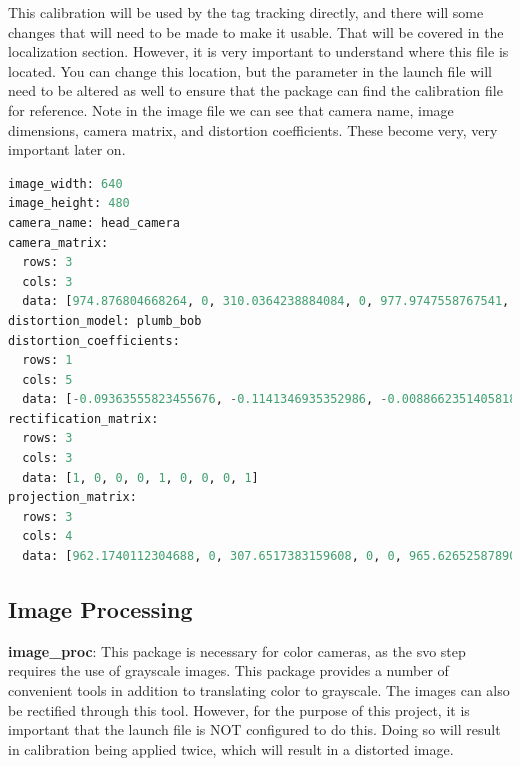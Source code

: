 \begin{itemize}
\begin{enumerate}
This calibration will be used by the tag tracking directly, and there will some changes that will need to be made to make it usable. That will be covered in the localization section. However, it is very important to understand where this file is located. You can change this location, but the parameter in the launch file will need to be altered as well to ensure that the package can find the calibration file for reference. Note in the image file we can see that camera name, image dimensions, camera matrix, and distortion coefficients. These become very, very important later on.
\begin{lstlisting}[language=python] 
image_width: 640
image_height: 480
camera_name: head_camera
camera_matrix:
  rows: 3
  cols: 3
  data: [974.876804668264, 0, 310.0364238884084, 0, 977.9747558767541, 183.9139863795955, 0, 0, 1]
distortion_model: plumb_bob
distortion_coefficients:
  rows: 1
  cols: 5
  data: [-0.09363555823455676, -0.1141346935352986, -0.008866235140581833, -0.0048644735641969, 0]
rectification_matrix:
  rows: 3
  cols: 3
  data: [1, 0, 0, 0, 1, 0, 0, 0, 1]
projection_matrix:
  rows: 3
  cols: 4
  data: [962.1740112304688, 0, 307.6517383159608, 0, 0, 965.6265258789062, 181.2353823390822, 0, 0, 0, 1, 0]
\end{lstlisting}
\end{enumerate}
\end{itemize}

\subsection{Image Processing}
\noindent \textbf{image\_proc}: This package is necessary for color cameras, as the svo step requires the use of grayscale images. This package provides a number of convenient tools in addition to translating color to grayscale. The images can also be rectified through this tool. However, for the purpose of this project, it is important that the launch file is NOT configured to do this. Doing so will result in calibration being applied twice, which will result in a distorted image.\\

